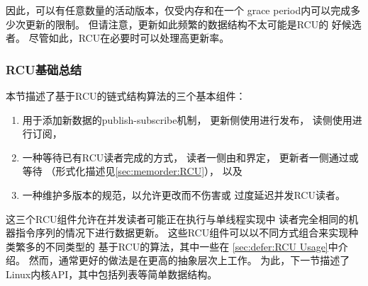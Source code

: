 {{	因此，可以有任意数量的活动版本，仅受内存和在一个
	grace period内可以完成多少次更新的限制。
	但请注意，更新如此频繁的数据结构不太可能是RCU的
	好候选者\@。
	尽管如此，RCU在必要时可以处理高更新率。
}\QuickQuizEndM
%
\QuickQuizEndE
}

\subsubsection{RCU基础总结}
\label{sec:defer:Summary of RCU Fundamentals}

本节描述了基于RCU的链式结构算法的三个基本组件：

\begin{enumerate}
\item	用于添加新数据的publish-subscribe机制，
	更新侧使用进行发布，
	读侧使用进行订阅，

\item	一种等待已有RCU读者完成的方式，
	读者一侧由和界定，
	更新者一侧通过或
	等待
	（形式化描述见\cref{sec:memorder:RCU}），
	以及

\item	一种维护多版本的规范，以允许更改而不伤害或
	过度延迟并发RCU读者。
\end{enumerate}

\QuickQuizEnd

这三个RCU组件允许在并发读者可能正在执行与单线程实现中
读者完全相同的机器指令序列的情况下进行数据更新。
这些RCU组件可以以不同方式组合来实现种类繁多的不同类型的
基于RCU的算法，其中一些在
\cref{sec:defer:RCU Usage}中介绍。
然而，通常更好的做法是在更高的抽象层次上工作。
为此，下一节描述了Linux内核API，其中包括列表等简单数据结构。
